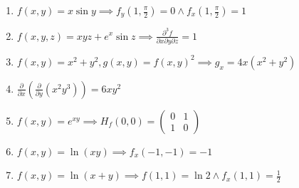 \documentclass[11pt,a4paper]{article}
\begin{document}
\begin{enumerate}
\item $\displaystyle f(x, y) = x \sin y \implies f_{y}\left( 1, \frac{\pi}{2} \right) = 0 \land f_{x}\left( 1, \frac{\pi}{2} \right) = 1$
\item $\displaystyle f(x, y, z) = xyz + e^{x} \sin z \implies \frac{\partial^{3} f}{\partial x \partial y \partial z} = 1$
\item $\displaystyle f(x, y) = x^{2} + y^{2}, g(x, y) = f(x, y)^{2} \implies g_{x} = 4x(x^{2} + y^{2})$
\item $\displaystyle \frac{\partial}{\partial x}\left( \frac{\partial}{\partial y}\left( x^{2} y^{3} \right) \right) = 6xy^{2}$
\item $\displaystyle f(x, y) = e^{xy} \implies H_{f}(0, 0) = \begin{pmatrix} 0 & 1 \\ 1 & 0 \end{pmatrix}$
\item $\displaystyle f(x, y) = \ln(xy) \implies f_{x}(-1, -1) = -1$
\item $\displaystyle f(x, y) = \ln(x + y) \implies f(1, 1) = \ln 2 \land f_{x}(1, 1) = \frac{1}{2}$
\end{enumerate}
\end{document}
